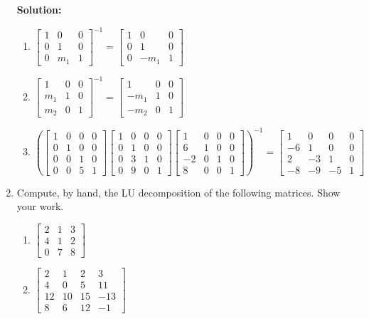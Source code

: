 \documentclass[]{article}
\newcommand{\bbm}{\begin{bmatrix}}		%
\newcommand{\ebm}{\end{bmatrix}}		%
\newcommand{\solution}{\vskip 0.5cm \textbf{\large Solution:} \\}
\begin{document}
\begin{enumerate}
	  \solution
	  \begin{enumerate}
	  \item $\bbm 1&0&0\\0&1&0\\0&m_1&1 \ebm^{-1} = \bbm 1&0&0\\0&1&0\\0&-m_1&1 \ebm$
	  \item $\bbm 1&0&0\\m_1&1&0\\m_2&0&1 \ebm^{-1} = \bbm 1&0&0\\-m_1&1&0\\-m_2&0&1 \ebm$
	  \item
        $\left(\bbm 1&0&0&0\\0&1&0&0\\0&0&1&0\\0&0&5&1 \ebm \bbm 1&0&0&0\\0&1&0&0\\0&3&1&0\\0&9&0&1 \ebm \bbm 1&0&0&0\\6&1&0&0\\-2&0&1&0\\8&0&0&1\ebm \right)^{-1} =
        \bbm 1&0&0&0\\-6&1&0&0\\2&-3&1&0\\-8&-9&-5&1 \ebm$
	  \end{enumerate}


	\item Compute, by hand, the LU decomposition of the following matrices. Show your work.
	  \begin{enumerate}
	  \item $\bbm 2&1&3\\4&1&2\\0&7&8 \ebm $
	  \item $\bbm 2&1&2&3\\4&0&5&11\\12&10&15&-13\\8&6&12&-1 \ebm $
	  \end{enumerate}


\end{enumerate}
\end{document}
